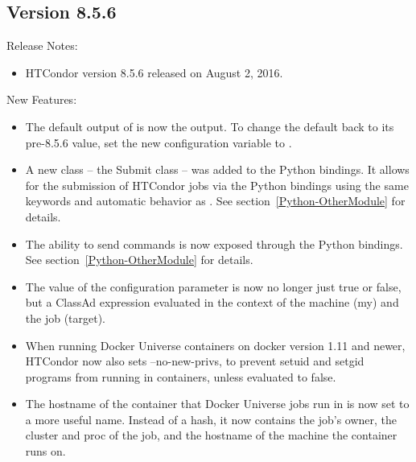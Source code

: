 \subsection*{\label{sec:New-8-5-6}Version 8.5.6}

\noindent Release Notes:

\begin{itemize}

\item HTCondor version 8.5.6 released on August 2, 2016.

\end{itemize}


\noindent New Features:

\begin{itemize}

\item The default output of  is now the  output.
To change the default back to its pre-8.5.6 value, set the new
configuration variable  to
.

\item A new class -- the Submit class -- was added to the Python
bindings. It allows for the submission of HTCondor jobs via the
Python bindings using the same keywords and automatic behavior as
.
See section~\ref{Python-OtherModule} for details.

\item The ability to send  commands is now exposed
through the Python bindings.
See section~\ref{Python-OtherModule} for details.

\item The value of the configuration parameter 
 is now no longer just
true or false, but a ClassAd expression evaluated in the context
of the machine (my) and the job (target).

\item When running Docker Universe containers on docker version 1.11
and newer, HTCondor now also sets --no-new-privs, to prevent
setuid and setgid programs from running in containers, unless
 evaluated to false.

\item The hostname of the container that Docker Universe jobs
run in is now set to a more useful name.  Instead of a hash, it
now contains the job's owner, the cluster and proc of the job,
and the hostname of the machine the container runs on.


\end{itemize}
